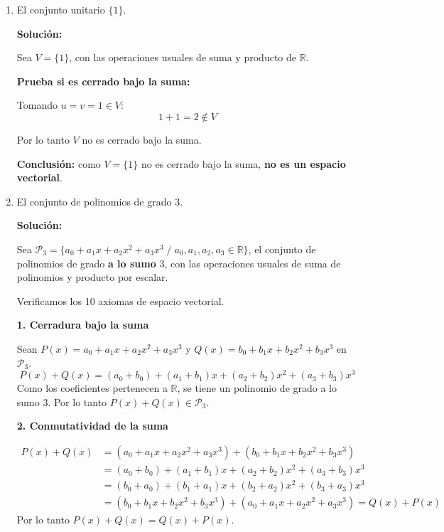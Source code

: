 \documentclass[12pt]{article}
\newcommand{\solucion}{%
    \vspace{0.8em}%
    \textbf{Solución:}%
    \vspace{0.8em}%
}
\begin{document}
\begin{enumerate}[label=\alph*.-]
    Para $u=(x_1,mx_1) \in L$:
    \[
    1\cdot u = 1\cdot(x_1,mx_1) = (1\cdot x_1,\,1\cdot mx_1) = (x_1,mx_1) = u
    \]
    Por lo tanto existe $1 \in \mathbb{R}$ tal que $1\cdot u = u$.

    \textbf{Conclusión:}

    Como se cumplen los 10 axiomas, $L=\{(x,y)\in\mathbb{R}^2 \, / \, y=mx,\, m\in\mathbb{R}\}$ \textbf{es un espacio vectorial} con las operaciones usuales de $\mathbb{R}^2$.

    \item El conjunto unitario $\{1\}$.

    \solucion

    Sea $V=\{1\}$, con las operaciones usuales de suma y producto de $\mathbb{R}$.

    \textbf{Prueba si es cerrado bajo la suma:}

    Tomando $u=v=1\in V$:
    \[
    1+1 = 2 \notin V
    \]

    Por lo tanto $V$ no es cerrado bajo la suma.

    \textbf{Conclusión:} como $V=\{1\}$ no es cerrado bajo la suma, \textbf{no es un espacio vectorial}.

    \item El conjunto de polinomios de grado 3.

    \solucion

    Sea $\mathcal{P}_3 = \{a_0+a_1x+a_2x^2+a_3x^3 \; / \; a_0,a_1,a_2,a_3 \in \mathbb{R}\}$, el conjunto de polinomios de grado \textbf{a lo sumo} 3, con las operaciones usuales de suma de polinomios y producto por escalar.

    Verificamos los 10 axiomas de espacio vectorial.

    \textbf{1. Cerradura bajo la suma}

    Sean $P(x)=a_0+a_1x+a_2x^2+a_3x^3$ y $Q(x)=b_0+b_1x+b_2x^2+b_3x^3$ en $\mathcal{P}_3$.
    \[
    P(x)+Q(x) = (a_0+b_0)+(a_1+b_1)x+(a_2+b_2)x^2+(a_3+b_3)x^3
    \]
    Como los coeficientes pertenecen a $\mathbb{R}$, se tiene un polinomio de grado a lo sumo 3. Por lo tanto $P(x)+Q(x) \in \mathcal{P}_3$.

    \textbf{2. Conmutatividad de la suma}

    \begin{align*}
    P(x)+Q(x) &= (a_0+a_1x+a_2x^2+a_3x^3)+(b_0+b_1x+b_2x^2+b_3x^3)\\
    &= (a_0+b_0)+(a_1+b_1)x+(a_2+b_2)x^2+(a_3+b_3)x^3\\
    &= (b_0+a_0)+(b_1+a_1)x+(b_2+a_2)x^2+(b_3+a_3)x^3\\
    &= (b_0+b_1x+b_2x^2+b_3x^3)+(a_0+a_1x+a_2x^2+a_3x^3) = Q(x)+P(x)
    \end{align*}
    Por lo tanto $P(x)+Q(x)=Q(x)+P(x)$.


\end{enumerate}
\end{document}
